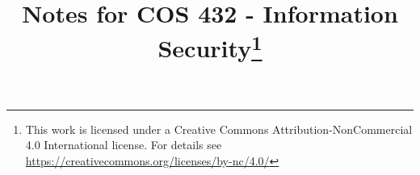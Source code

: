  \title{\vspace*{-2cm} Notes for COS 432 - Information Security\vspace*{-12mm}\footnote{This work is licensed under
a Creative Commons Attribution-NonCommercial 4.0 International license.  
For details see \url{https://creativecommons.org/licenses/by-nc/4.0/}}}
 \author{}
 \date{}
 \maketitle

 {\thispagestyle{empty}
  \vspace*{-2em}
  \tableofcontents
 }
